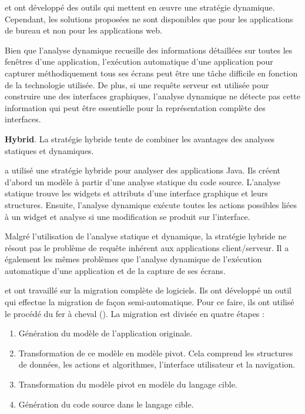 \documentclass[a4paper]{article}
\begin{document}
\citet{Memo03b, Sami07a, Shah11b} et \citet{Morg11a} ont développé des outils qui mettent en œuvre une stratégie dynamique.
Cependant, les solutions proposées ne sont disponibles que pour les applications de bureau et non pour les applications web.

Bien que l'analyse dynamique recueille des informations détaillées sur toutes les fenêtres d'une application,
  l'exécution automatique d'une application pour capturer méthodiquement tous ses écrans peut être une tâche difficile en fonction de la technologie utilisée.
De plus, si une requête serveur est utilisée pour construire une des interfaces graphiques, l'analyse dynamique ne détecte pas cette information qui peut être essentielle pour la représentation complète des interfaces.

\textbf{Hybrid}. La stratégie hybride tente de combiner les avantages des analyses statiques et dynamiques.

\citet{Gott16a} a utilisé une stratégie hybride pour analyser des applications Java.
Ils créent d'abord un modèle à partir d'une analyse statique du code source.
L'analyse statique trouve les widgets et attributs d'une interface graphique et leurs structures.
Ensuite, l'analyse dynamique exécute toutes les actions possibles liées à un widget et analyse si
  une modification se produit sur l'interface.

Malgré l'utilisation de l'analyse statique et dynamique, la stratégie hybride ne résout pas le problème de requête inhérent aux applications client/serveur.
Il a également les mêmes problèmes que l'analyse dynamique de l'exécution automatique d'une application et de la capture de ses écrans.

\citet{Fleu07b} et \citet{Garce17b} ont travaillé sur la migration complète de logiciels.
Ils ont développé un outil qui effectue la migration de façon semi-automatique.
Pour ce faire, ils ont utilisé le procédé du fer à cheval (\citet{Kazm98a}). 
La migration est divisée en quatre étapes :

\begin{enumerate}
\def\labelenumi{\arabic{enumi}.}
    \item Génération du modèle de l'application originale.
    \item Transformation de ce modèle en modèle pivot.
Cela comprend les structures de données, les actions et algorithmes, l'interface utilisateur et la navigation.
    \item
Transformation du modèle pivot en modèle du langage cible.
    \item
Génération du code source dans le langage cible.
\end{enumerate}
\end{document}
